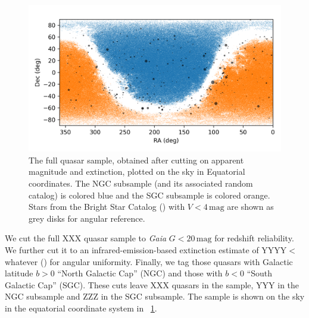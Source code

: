 \documentclass[modern]{aastex631}
\newlength{\figurewidth}
\newcommand{\unit}[1]{\mathrm{#1}}
\newcommand{\mg}{\unit{mag}}
\newcommand{\figref}[1]{\figurename~\ref{#1}}
\begin{document}
\begin{figure}[t!]
  \begin{mdframed}
  \color{captiongray}
  \begin{center}
    \includegraphics[width=\figurewidth]{notebooks/radec.png}
  \end{center}
    \caption{The full quasar sample, obtained after cutting on apparent magnitude and extinction, plotted on the sky in Equatorial coordinates.
    The NGC subsample (and its associated random catalog) is colored blue and the SGC subsample is colored orange.
    Stars from the Bright Star Catalog (\citealt{bsc}) with $V<4\,\mg$ are shown as grey disks for angular reference.\label{fig:radec}}
  \end{mdframed}
\end{figure}
We cut the full XXX quasar sample to \textsl{Gaia} $G<20\,\mg$ for redshift reliability.
We further cut it to an infrared-emission-based extinction estimate of YYYY$<$whatever (\citealt{sfd}) for angular uniformity.
Finally, we tag those quasars with Galactic latitude $b>0$ ``North Galactic Cap'' (NGC) and those with $b<0$ ``South Galactic Cap'' (SGC).
These cuts leave XXX quasars in the sample, YYY in the NGC subsample and ZZZ in the SGC subsample.
The sample is shown on the sky in the equatorial coordinate system in \figref{fig:radec}.
\end{document}
